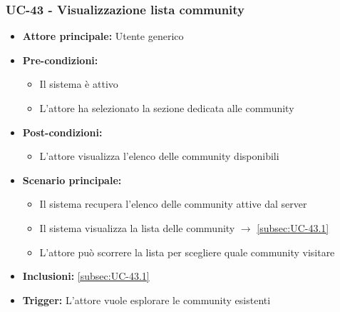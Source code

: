 \documentclass[a4paper,12pt]{article}
\begin{document}
\subsubsection{UC-43 - Visualizzazione lista community} \label{sec:UC-43}
\begin{itemize}
    \item \textbf{Attore principale:} Utente generico
    \item \textbf{Pre-condizioni:}
    \begin{itemize}
        \item Il sistema è attivo
        \item L'attore ha selezionato la sezione dedicata alle community
    \end{itemize}
    \item \textbf{Post-condizioni:}
    \begin{itemize}
        \item L'attore visualizza l'elenco delle community disponibili
    \end{itemize}
    \item \textbf{Scenario principale:} 
    \begin{itemize}
        \item Il sistema recupera l'elenco delle community attive dal server
        \item Il sistema visualizza la lista delle community $\rightarrow$ \ref{subsec:UC-43.1}
        \item L'attore può scorrere la lista per scegliere quale community visitare
    \end{itemize}
    \item \textbf{Inclusioni:} \ref{subsec:UC-43.1}
    \item \textbf{Trigger:} L'attore vuole esplorare le community esistenti
\end{itemize}
\end{document}
